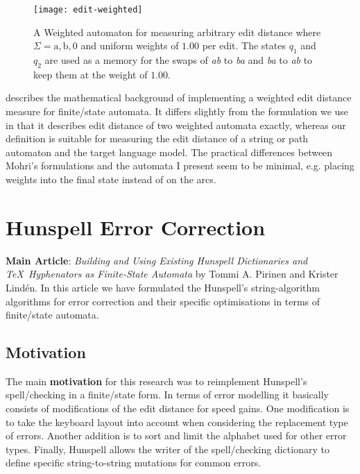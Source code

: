 \documentclass[officiallayout,final]{unihelcompling}
\begin{document}
\begin{figure}
    \texttt{[image: edit-weighted]}
    \caption{A Weighted automaton for measuring arbitrary edit distance where
        $\Sigma = {\mathrm{a}, \mathrm{b}, 0}$ and uniform weights of $1.00$ per
        edit. The states $q_1$ and $q_2$ are used as a memory for
        the swaps of \emph{ab} to \emph{ba} and \emph{ba} to \emph{ab} to
        keep them at the weight of $1.00$. \label{fig:edit-weighted}}
\end{figure}

\citet{mohri2003edit} describes the mathematical background of implementing a
weighted edit distance measure for finite\-/state automata. It differs slightly
from the formulation we use in that it describes edit distance of two weighted
automata exactly, whereas our definition is suitable for measuring the edit
distance of a string or path automaton and the target language model. The
practical differences between Mohri's formulations and the automata I present
seem to be minimal, e.g. placing weights into the final state instead
of on the arcs.

\section{Hunspell Error Correction}
\label{sec:Hunspell-error}

\textbf{Main Article}: \emph{Building and Using Existing Hunspell Dictionaries
and \TeX\ Hyphenators as Finite-State Automata} by Tommi A. Pirinen and Krister
Lindén.  In this article we have formulated the Hunspell's string-algorithm
algorithms for error correction and their specific optimisations in terms
of finite\-/state automata.

\subsection{Motivation}

The main \textbf{motivation} for this research was to reimplement Hunspell's
spell\-/checking in a finite\-/state form. In terms of error modelling it
basically consists of modifications of the edit distance for speed gains.  One
modification is to take the keyboard layout into account when considering the
replacement type of errors. Another addition is to sort and limit the alphabet
used for other error types. Finally, Hunspell allows the writer of the
spell\-/checking dictionary to define specific string-to-string mutations for
common errors.
\end{document}
